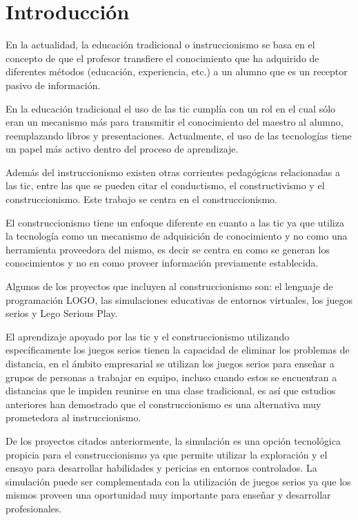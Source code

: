 \chapter{Introducción}


En la actualidad, la educación tradicional o instruccionismo se basa en el
concepto de que el profesor transfiere el conocimiento que ha adquirido de
diferentes métodos (educación, experiencia, etc.) a un alumno que es un receptor
pasivo de información\cite{laptop:instructionism}. 

En la educación tradicional el uso de las \Gls{tic} cumplía con un rol en el 
cual sólo eran un mecanismo más para transmitir el conocimiento del maestro al alumno,
reemplazando libros y presentaciones. Actualmente, el uso de las tecnologías tiene un
papel más activo dentro del proceso de aprendizaje.

Además del instruccionismo existen otras corrientes pedagógicas relacionadas a
las \Gls{tic}, entre las que se pueden citar el conductismo, el constructivismo
y el construccionismo. Este trabajo se centra en el construccionismo.

El construccionismo tiene un enfoque diferente en cuanto a las \Gls{tic} ya que
utiliza la tecnología como un mecanismo de adquisición de conocimiento y no como
una herramienta proveedora del mismo\cite{sasha:construtivism}, es decir se
centra en como se generan los conocimientos y no en como proveer información
previamente establecida. 

Algunos de los proyectos que incluyen al construccionismo son: 
el lenguaje de programación LOGO, las simulaciones educativas de entornos virtuales, 
los juegos serios y Lego Serious Play.

El aprendizaje apoyado por las \Gls{tic} y el construccionismo utilizando
específicamente los juegos serios tienen la capacidad de eliminar los problemas
de distancia, en el ámbito empresarial se utilizan los juegos serios para
enseñar a grupos de personas a trabajar en equipo, incluso cuando estos se
encuentran a distancias que le impiden reunirse en una clase
tradicional\cite{mariluz:seiousgames}, es así que estudios anteriores han
demostrado que el construccionismo es una alternativa muy prometedora al
instruccionismo\cite{sasha:construtivism}.
   
De los proyectos citados anteriormente, la simulación es una opción tecnológica
propicia para el construccionismo ya que permite utilizar la exploración y el
ensayo para desarrollar habilidades y pericias en entornos
controlados\cite{humphreys2013developing}. La simulación puede ser complementada
con la utilización de juegos serios ya que los mismos proveen una oportunidad
muy importante para enseñar y desarrollar profesionales\cite{sg:aoverview}.

